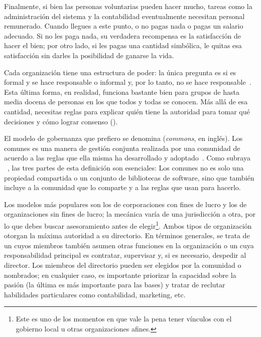 Finalmente,
si bien  las personas voluntarias pueden hacer mucho,
tareas como la administración del sistema y la contabilidad eventualmente necesitan personal remunerado.
Cuando llegues a este punto, o no pagas nada o pagas un salario adecuado.
Si no les paga nada, su verdadera recompensa es la satisfacción de hacer el bien;
por otro lado, si les pagas una cantidad simbólica, le quitas esa satisfacción sin darles la posibilidad de ganarse la vida.


Cada organización tiene una estructura de poder:
la única pregunta es si es formal y se hace responsable o informal y, por lo tanto, no se hace responsable~\cite{Free1972}.
Esta última forma, en realidad, funciona bastante bien para grupos de hasta media docena de personas
en los que todos y todas se conocen.
Más allá de esa cantidad,
necesitas reglas para explicar
quién tiene la autoridad para tomar qué decisiones
y cómo lograr consenso ().

El modelo de gobernanza que prefiero se denomina  (\emph{commons}, en inglés). Los comunes es una manera de gestión conjunta realizada por una comunidad
de acuerdo a las reglas que ella misma ha desarrollado y adoptado~\cite{Ostr2015}.
Como subraya ~\cite{Boll2014}, las tres partes de esta definición son esenciales:
Los comunes no es solo una propiedad compartida o un conjunto de bibliotecas de software,
sino que también incluye a la comunidad que lo comparte y a las reglas que usan para hacerlo.

Los modelos más populares son los de corporaciones con fines de lucro y los de organizaciones sin fines de lucro;
la mecánica varía de una jurisdicción a otra,
por lo que debes buscar asesoramiento antes de elegir\footnote{
  Este es uno de los momentos
  en que vale la pena tener vínculos con el gobierno local u otras organizaciones afines.}.
Ambos tipos de organización otorgan la máxima autoridad a su directorio.
En términos generales, se trata de un 
cuyos miembros también asumen otras funciones en la organización
o un  cuya responsabilidad principal es contratar, supervisar
y, si es necesario, despedir al director.
Los miembros del directorio pueden ser elegidos por la comunidad o nombrados;
en cualquier caso, es importante priorizar la capacidad sobre la pasión
(la última es más importante para las bases)
y tratar de reclutar habilidades particulares como contabilidad, marketing, etc.

